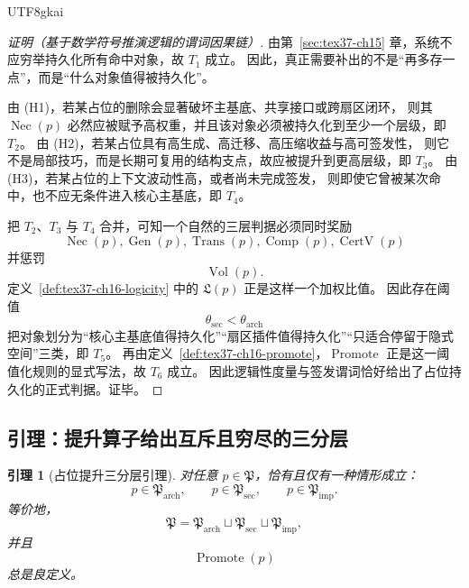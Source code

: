 \documentclass[12pt]{article}
\newtheorem{lemma}{引理}[section]
\newcommand{\Promote}{\operatorname{Promote}}
\begin{document}
\begin{CJK*}{UTF8}{gkai}
\begin{proof}[证明（基于数学符号推演逻辑的谓词因果链）]
由第~\ref{sec:tex37-ch15} 章，系统不应穷举持久化所有命中对象，故 $T_1$ 成立。
因此，真正需要补出的不是“再多存一点”，而是“什么对象值得被持久化”。

由 \textnormal{(H1)}，若某占位的删除会显著破坏主基底、共享接口或跨扇区闭环，
则其 $\operatorname{Nec}(p)$ 必然应被赋予高权重，并且该对象必须被持久化到至少一个层级，即 $T_2$。
由 \textnormal{(H2)}，若某占位具有高生成、高迁移、高压缩收益与高可签发性，
则它不是局部技巧，而是长期可复用的结构支点，故应被提升到更高层级，即 $T_3$。
由 \textnormal{(H3)}，若某占位的上下文波动性高，或者尚未完成签发，
则即使它曾被某次命中，也不应无条件进入核心主基底，即 $T_4$。

把 $T_2$、$T_3$ 与 $T_4$ 合并，可知一个自然的三层判据必须同时奖励
\[
  \operatorname{Nec}(p),\operatorname{Gen}(p),\operatorname{Trans}(p),\operatorname{Comp}(p),\operatorname{CertV}(p)
\]
并惩罚
\[
  \operatorname{Vol}(p).
\]
定义~\ref{def:tex37-ch16-logicity} 中的 $\mathfrak L(p)$ 正是这样一个加权比值。
因此存在阈值
\[
  \theta_{\mathrm{sec}}<\theta_{\mathrm{arch}}
\]
把对象划分为“核心主基底值得持久化”“扇区插件值得持久化”“只适合停留于隐式空间”三类，即 $T_5$。
再由定义~\ref{def:tex37-ch16-promote}，$\Promote$ 正是这一阈值化规则的显式写法，故 $T_6$ 成立。
因此逻辑性度量与签发谓词恰好给出了占位持久化的正式判据。证毕。
\end{proof}

\subsection{引理：提升算子给出互斥且穷尽的三分层}
\label{subsec:tex37-ch16-lemma}

\begin{lemma}[占位提升三分层引理]
\label{lem:tex37-ch16-trichotomy}
对任意 $p\in\mathfrak P$，恰有且仅有一种情形成立：
\[
  p\in \mathfrak P_{\mathrm{arch}},
  \qquad
  p\in \mathfrak P_{\mathrm{sec}},
  \qquad
  p\in \mathfrak P_{\mathrm{imp}}.
\]
等价地，
\[
  \mathfrak P
  =
  \mathfrak P_{\mathrm{arch}}
  \sqcup
  \mathfrak P_{\mathrm{sec}}
  \sqcup
  \mathfrak P_{\mathrm{imp}},
\]
并且
\[
  \Promote(p)
\]
总是良定义。
\end{lemma}


\end{CJK*}
\end{document}

